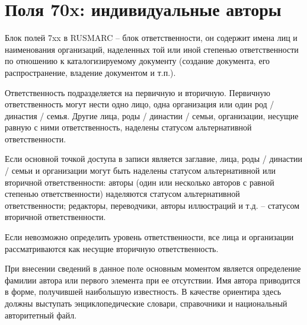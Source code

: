 \section*{Поля 70x: индивидуальные авторы}

Блок полей 7xx в RUSMARC  -- блок ответственности, он содержит имена лиц и наименования организаций, наделенных той или иной степенью ответственности по отношению к каталогизируемому документу (создание документа, его распространение, владение документом и т.п.).

Ответственность подразделяется на первичную и вторичную. Первичную ответственность могут нести одно лицо, одна организация или один род / династия / семья. Другие лица, роды / династии / семьи, организации, несущие равную с ними ответственность, наделены статусом альтернативной ответственности.

Если основной точкой доступа в записи является заглавие, лица, роды / династии / семьи и организации могут быть наделены статусом альтернативной или вторичной ответственности: авторы (один или несколько авторов с равной степенью ответственности) наделяются статусом альтернативной ответственности; редакторы, переводчики, авторы иллюстраций и т.д. -- статусом вторичной ответственности.

Если невозможно определить уровень ответственности, все лица и организации рассматриваются как несущие вторичную ответственность.

При внесении сведений в данное поле основным моментом является определение фамилии автора или первого элемента при ее отсутствии. Имя автора приводится в форме, получившей наибольшую известность. В качестве ориентира здесь должны выступать энциклопедические словари, справочники и национальный авторитетный файл.
